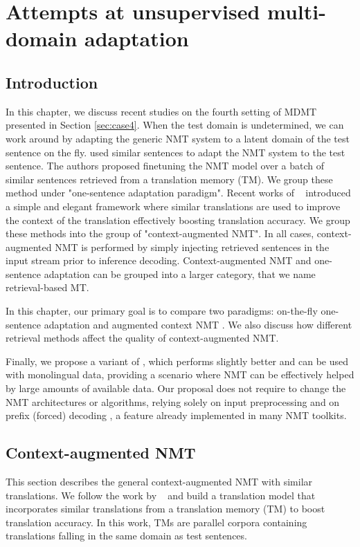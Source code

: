 \chapter{Attempts at unsupervised multi-domain adaptation}
\label{chap:priming}
\section{Introduction}
In this chapter, we discuss recent studies on the fourth setting of MDMT presented in Section \ref{sec:case4}. When the test domain is undetermined, we can work around by adapting the generic NMT system to a latent domain of the test sentence on the fly. \citet{Li18onesentence, Farajian17multidomain} used similar sentences to adapt the NMT system to the test sentence. The authors proposed finetuning the NMT model over a batch of similar sentences retrieved from a translation memory (TM). We group these method under "one-sentence adaptation paradigm". Recent works of ~\citet{bulte19neural,xu20boosting} introduced a simple and elegant framework where similar translations are used to improve the context of the translation effectively boosting translation accuracy. We group these methods into the group of "context-augmented NMT". In all cases, context-augmented NMT is performed by simply injecting retrieved sentences in the input stream prior to inference decoding. Context-augmented NMT and one-sentence adaptation can be grouped into a larger category, that we name retrieval-based MT.

In this chapter, our primary goal is to compare two paradigms: on-the-fly one-sentence adaptation \citep{Farajian17multidomain,Li18onesentence} and augmented context NMT \citep{bulte19neural,xu20boosting}. We also discuss how different retrieval methods affect the quality of context-augmented NMT. 

Finally, we propose a variant of \citet{bulte19neural}, which performs slightly better and can be used with monolingual data, providing a scenario where NMT can be effectively helped by large amounts of available data. Our proposal does not require to change the NMT architectures or algorithms, relying solely on input preprocessing and on prefix (forced) decoding \citep{rebecca16neural,santy19inmt}, a feature already implemented in many NMT toolkits.

\section{Context-augmented NMT}
\label{sec:priming-chap8}
This section describes the general context-augmented NMT with similar translations. We follow the work by ~\citet{bulte19neural,xu20boosting} and build a translation model that incorporates similar translations from a translation memory (TM) to boost translation accuracy. In this work, TMs are parallel corpora containing translations falling in the same domain as test sentences.

